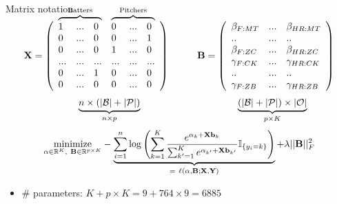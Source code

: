 \documentclass[handout]{beamer}
\def\P{\mathcal P}\def\Q{\mathcal Q}\def\R{\mathcal R}\def\S{\mathcal S}
\def\mR{\mathbb R}\def\mS{\mathbb S}
\def\bb{{\bf b}}\def\bu{{\bf u}}\def\bv{{\bf v}}\def\bx{{\bf x}}
\def\balpha{{\bf \alpha}}\def\bSigma{{\bf \Sigma}}
\def\l{\left}\def\r{\right}\def\lf{\lfloor}\def\rf{\rfloor}
\newcommand\bovermat[3]{\makebox[0pt][l]{$\smash{\overbrace{\phantom{
      \begin{matrix}#3\end{matrix}}}^{\text{#1}}}$}#2}
\begin{document}
\begin{frame}{Matrix notation}
\scriptsize
$$\bX = \l(\begin{array}{llllll}
        \bovermat{Batters}{1&...&0}{...&...&...}&
        \bovermat{Pitchers}{0&...&0}{...&...&...}\\
        0&...&0&0&...&1\\
        0&...&0&1&...&0\\
        ...&...&...&...&...&...\\
        0&...&1&0&...&0\\
        0&...&0&0&...&0
    \end{array}\r)
\hspace{1cm}
\bB = \l(\begin{array}{lll}
  \beta_{F:MT}&...&\beta_{HR:MT}\\
  ..&...&..\\
  \beta_{F:ZC}&...&\beta_{HR:ZC}\\
  \gamma_{F:CK}&...&\gamma_{HR:CK}\\
  ..&...&..\\
  \gamma_{F:ZB}&...&\gamma_{HR:ZB}
\end{array}\r)$$
    $$\hspace{10mm} \underbrace{n\times(|\B|+|\P|)}_{n \times p}
    \hspace{35mm} \underbrace{(|\B| + |\P|)\times|\O|}_{p\times K}$$
  \vspace{4mm}
    \normalsize 
$$\underset{\balpha\in\mR^K,~\bB\in\mR^{p\times K}}{\mbox{minimize}}
  -\underbrace{\sum_{i=1}^n\log\l(\sum_{k=1}^K\frac{e^{\alpha_k + \bX\bb_k}}
  {\sum_{k' = 1}^Ke^{\alpha_{k'} + \bX\bb_{k'}}}\mI_{\{y_i = k\}}\r)}_{
  \normalsize =~\ell(\alpha, \bB; \bX, \bY)}
  + \lambda||\bB||_F^2$$
  \pause
  \begin{itemize}
    \item \# parameters: \hspace{4mm} $K + p \times K = 9 + 764 \times 9 = 6885$
  \end{itemize}
\end{frame}
\end{document}
